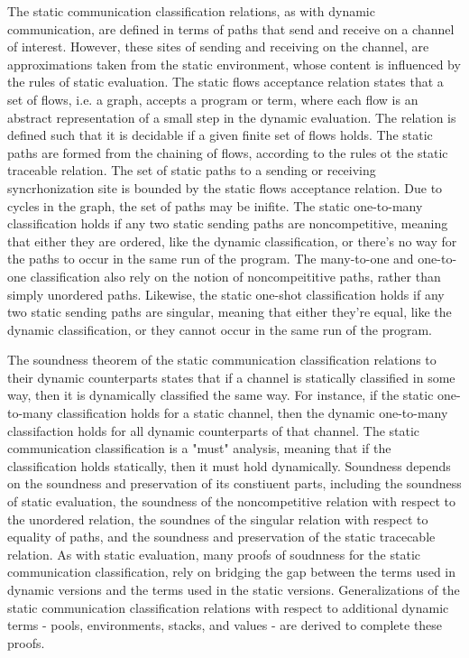 \documentclass[letterpaper, 11pt]{extarticle}
\begin{document}
The static communication classification relations, as with dynamic communication, are defined in terms of paths
that send and receive on a channel of interest. However, these sites of sending and receiving on the channel, are approximations
taken from the static environment, whose content is influenced by the rules of static evaluation.
The static flows acceptance relation states that a set of flows, i.e. a graph, accepts a program or term, where each flow is
an abstract representation of a small step in the dynamic evaluation. The relation is defined such that
it is decidable if a given finite set of flows holds. The static paths are formed from the chaining of flows, according
to the rules ot the static traceable relation.
The set of static paths to a sending or receiving syncrhonization site is bounded by the static flows acceptance
relation. Due to cycles in the graph, the set of paths may be inifite. 
The static one-to-many classification holds if any two static sending paths are noncompetitive, meaning
that either they are ordered, like the dynamic classification, or there's no way for the paths to occur in the same run
of the program. The many-to-one and one-to-one classification also rely on the notion of noncompeititive paths, rather than
simply unordered paths. Likewise, the static one-shot classification holds if any two static sending paths are singular,
meaning that either they're equal, like the dynamic classification, or they cannot occur in the same run of the program.

The soundness theorem of the static communication classification relations to their dynamic counterparts states that if
a channel is statically classified in some way, then it is dynamically classified the same way. For instance, if the
static one-to-many classification holds for a static channel, then the dynamic one-to-many classifaction holds for
all dynamic counterparts of that channel. The static communication classification is a "must" analysis, meaning that
if the classification holds statically, then it must hold dynamically. Soundness depends on the soundness and preservation
of its constiuent parts,
including the soundness of static evaluation, the soundness of the noncompetitive relation with respect to
the unordered relation, the soundnes of the singular relation with respect to equality of paths,
and the soundness and preservation of the static tracecable relation. As with static evaluation, many proofs of
soudnness for the static communication classification, rely on bridging the gap between the terms used in dynamic
versions and the terms used in the static versions. Generalizations of the static communication classification relations
with respect to additional dynamic terms - pools, environments, stacks, and values - are derived to complete these proofs.
\end{document}
